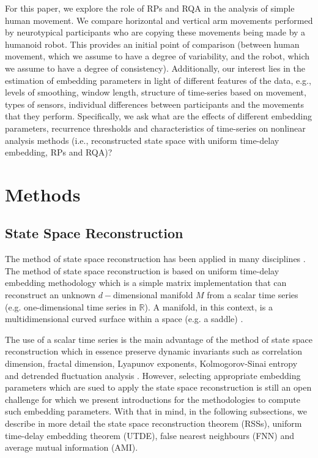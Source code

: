 \documentclass[fleqn,10pt]{wlscirep}
\begin{document}
For this paper, we explore the role of RPs and RQA in the analysis of simple human movement.
We compare horizontal and vertical arm movements performed by neurotypical participants who are copying these movements being made by a humanoid robot.
This provides an initial point of comparison (between human movement, which we assume to have a degree of variability, and the robot, which we assume to have a degree of consistency).
Additionally, our interest lies in the estimation of embedding parameters in light of different features of the data, e.g., levels of smoothing, window length, structure of time-series based on movement, types of sensors, individual differences between participants and the movements that they perform.
Specifically, we ask what are the effects of different embedding parameters, recurrence thresholds and characteristics of time-series on nonlinear analysis methods (i.e., reconstructed state space with uniform time-delay embedding, RPs and RQA)?

\section*{Methods}
\subsection*{State Space Reconstruction}
The method of state space reconstruction \cite{packard1980, takens1981} has been applied in many disciplines \cite{aguirre2009, stergiou2011, frank2010, sama2013, Quintana-Duque2016}.
The method of state space reconstruction is based on uniform time-delay embedding methodology which is a simple matrix implementation that can reconstruct an unknown $d-$dimensional manifold $M$ from a scalar time series (e.g. one-dimensional time series in $\mathbb{R}$).
A manifold, in this context, is a multidimensional curved surface within a space (e.g. a saddle) \cite{guastello-gregson2011}.

The use of a scalar time series is the main advantage of the method of state space reconstruction which in essence preserve dynamic invariants such as correlation dimension, fractal dimension, Lyapunov exponents, Kolmogorov-Sinai entropy and detrended fluctuation analysis \cite{bradley2015, Quintana-Duque2012, Quintana-Duque2013, Quintana-Duque2016, krakovska2015}.
However, selecting appropriate embedding parameters which are sued to apply the state space reconstruction is still an open challenge for which we present introductions for the methodologies to compute such embedding parameters.
With that in mind, in the following subsections, we describe in more detail the state space reconstruction theorem (RSSs), uniform time-delay embedding theorem (UTDE), false nearest neighbours (FNN) and average mutual information (AMI).
\end{document}
